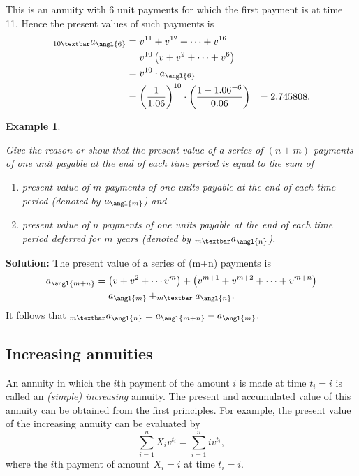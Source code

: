 \documentclass[landscape, 20pt]{extreport}
\theoremstyle{definition}
\theoremstyle{definition}
\newtheorem{example}{Example}[chapter]
\theoremstyle{definition}
\theoremstyle{definition}
\theoremstyle{remark}
\begin{document}
This is an annuity with 6 unit payments for which the first payment is
at time 11. Hence the present values of such payments is
\[\begin{aligned}
    _{10 \textbar}a_\angl{6}
  &= v^{11} + v^{12} + \cdots +v^{16}  \\
    &= v^{10}  \left( v + v^2 + \cdots + v^6  \right) \\
    &= v^{10} \cdot  a_\angl{6} \\
    &= \left(\frac{1}{1.06}\right)^{10} \cdot \left( \frac{1- 1.06^{-6}}{0.06} \right)
    &= 2.745808.\end{aligned}\]

\newpage \begin{example}
\protect\hypertarget{exm:unlabeled-div-27}{}\label{exm:unlabeled-div-27}

\emph{Give the reason or show that the present value of a
series of \((n+m)\) payments of one unit payable at the end of each time
period is equal to the sum of}

\begin{enumerate}
\def\labelenumi{\arabic{enumi}.}
\item
  \emph{present value of \(m\) payments of one units payable at the end of
  each time period (denoted by \(a_\angl{m}\)) and}
\item
  \emph{present value of \(n\) payments of one units payable at the end of
  each time period deferred for \(m\) years (denoted by
  \(_{m \textbar}a_\angl{n}\)).}
\end{enumerate}

\end{example}

\textbf{Solution:} The present value of a series of (m+n) payments is
\[\begin{aligned}
a_\angl{m+n} &=  \left( v + v^2 + \cdots  v^m\right) + \left( v^{m+1} + v^{m+2} + \cdots +v^{m+n} \right) \\
&= a_\angl{m} + _{m \textbar}a_\angl{n}.\end{aligned}\] It follows that
\(_{m \textbar}a_\angl{n} = a_\angl{m+n} - a_\angl{m}.\)

\hypertarget{increasing-annuities}{%
\subsection{Increasing annuities}\label{increasing-annuities}}

An annuity in which the \(i\)th payment of the amount \(i\) is made at time
\(t_i = i\) is called an \emph{(simple) increasing} annuity. The present and
accumulated value of this annuity can be obtained from the first
principles. For example, the present value of the increasing annuity can
be evaluated by \[\sum_{i=1}^n X_i v^{t_i} = \sum_{i=1}^n i v^{t_i},\]
where the \(i\)th payment of amount \(X_i = i\) at time \(t_i = i\).
\end{document}
